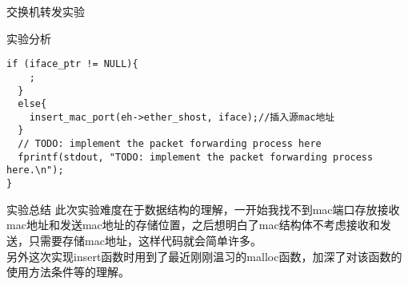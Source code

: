 \documentclass{article} %
\begin{document}
\begin{section}{交换机转发实验}
\begin{subsection}{实验分析}
\begin{enumerate}[1)]
\begin{lstlisting}[language={[ANSI]C}]
  if (iface_ptr != NULL){
	;
  }
  else{
	insert_mac_port(eh->ether_shost, iface);//插入源mac地址
  }
  // TODO: implement the packet forwarding process here
  fprintf(stdout, "TODO: implement the packet forwarding process here.\n");
}
					\end{lstlisting}
			\end{enumerate}
		\end{subsection}
		\begin{subsection}{实验总结}
			此次实验难度在于数据结构的理解，一开始我找不到mac端口存放接收mac地址和发送mac地址的存储位置，之后想明白了mac结构体不考虑接收和发送，只需要存储mac地址，这样代码就会简单许多。\\
			另外这次实现insert函数时用到了最近刚刚温习的malloc函数，加深了对该函数的使用方法条件等的理解。
		\end{subsection}
	\end{section}
\end{document}
